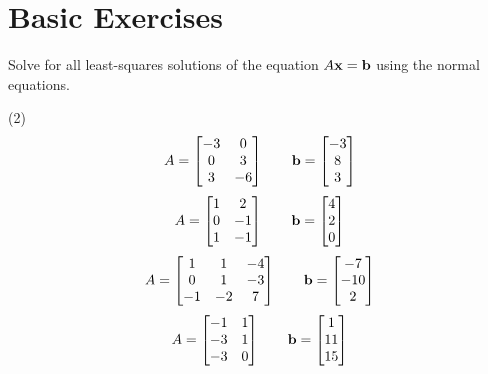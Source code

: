\section{Basic Exercises}

Solve for all least-squares solutions of the equation $A\mathbf x = \mathbf b$
using the normal equations.
\begin{tasks}[style=enumerate](2)
\task
  \begin{displaymath}
    A = \left[\begin{matrix}-3 & 0\\0 & 3\\3 & -6\end{matrix}\right]
    \qquad
    \mathbf b = \left[\begin{matrix}-3\\8\\3\end{matrix}\right]
  \end{displaymath}
\task
  \begin{displaymath}
    A =
    \begin{bmatrix}
      1 & 2 \\
      0 & -1 \\
      1 & -1
    \end{bmatrix}
    \qquad
    \mathbf b =  \begin{bmatrix} 4 \\ 2 \\ 0 \end{bmatrix} 
  \end{displaymath}
\task
  \begin{displaymath}
    A = \left[\begin{matrix}1 & 1 & -4\\0 & 1 & -3\\-1 & -2 & 7\end{matrix}\right]
    \qquad
    \mathbf b = \left[\begin{matrix}-7\\-10\\2\end{matrix}\right]
  \end{displaymath}
\task
  \begin{displaymath}
    A = \left[\begin{matrix}-1 & 1\\-3 & 1\\-3 & 0\end{matrix}\right]
    \qquad
    \mathbf b = \left[\begin{matrix}1\\11\\15\end{matrix}\right]
  \end{displaymath}
\task
  \begin{displaymath}

\end{displaymath}
\end{tasks}
